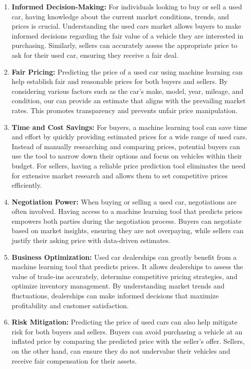 \documentclass[
  letterpaper,
  DIV=11,
  numbers=noendperiod]{scrartcl}
\begin{document}
\begin{enumerate}
\def\labelenumi{\arabic{enumi}.}
\item
  \textbf{Informed Decision-Making:} For individuals looking to buy or
  sell a used car, having knowledge about the current market conditions,
  trends, and prices is crucial. Understanding the used cars market
  allows buyers to make informed decisions regarding the fair value of a
  vehicle they are interested in purchasing. Similarly, sellers can
  accurately assess the appropriate price to ask for their used car,
  ensuring they receive a fair deal.
\item
  \textbf{Fair Pricing:} Predicting the price of a used car using
  machine learning can help establish fair and reasonable prices for
  both buyers and sellers. By considering various factors such as the
  car's make, model, year, mileage, and condition, our can provide an
  estimate that aligns with the prevailing market rates. This promotes
  transparency and prevents unfair price manipulation.
\item
  \textbf{Time and Cost Savings:} For buyers, a machine learning tool
  can save time and effort by quickly providing estimated prices for a
  wide range of used cars. Instead of manually researching and comparing
  prices, potential buyers can use the tool to narrow down their options
  and focus on vehicles within their budget. For sellers, having a
  reliable price prediction tool eliminates the need for extensive
  market research and allows them to set competitive prices efficiently.
\item
  \textbf{Negotiation Power:} When buying or selling a used car,
  negotiations are often involved. Having access to a machine learning
  tool that predicts prices empowers both parties during the negotiation
  process. Buyers can negotiate based on market insights, ensuring they
  are not overpaying, while sellers can justify their asking price with
  data-driven estimates.
\item
  \textbf{Business Optimization:} Used car dealerships can greatly
  benefit from a machine learning tool that predicts prices. It allows
  dealerships to assess the value of trade-ins accurately, determine
  competitive pricing strategies, and optimize inventory management. By
  understanding market trends and fluctuations, dealerships can make
  informed decisions that maximize profitability and customer
  satisfaction.
\item
  \textbf{Risk Mitigation:} Predicting the price of used cars can also
  help mitigate risk for both buyers and sellers. Buyers can avoid
  purchasing a vehicle at an inflated price by comparing the predicted
  price with the seller's offer. Sellers, on the other hand, can ensure
  they do not undervalue their vehicles and receive fair compensation
  for their assets.
\end{enumerate}
\end{document}
